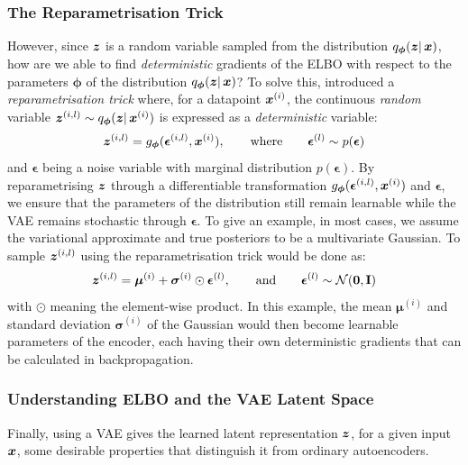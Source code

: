 \subsubsection{The Reparametrisation Trick}
However, since $\boldsymbol{z}$ is a random variable sampled from the distribution $q_{\boldsymbol{\phi}}(\boldsymbol{z} |\, \boldsymbol{x})$, how are we able to find \textit{deterministic} gradients of the ELBO with respect to the parameters $\boldsymbol{\phi}$ of the distribution $q_{\boldsymbol{\phi}}(\boldsymbol{z} |\, \boldsymbol{x})$? 
To solve this, \cite{variational_bayes} introduced a \textit{reparametrisation trick} where, for a datapoint $\boldsymbol{x}^{(i)}$, the continuous \textit{random} variable $\boldsymbol{z}^{(i,l)} \sim q_{\boldsymbol{\phi}}(\boldsymbol{z} |\, \boldsymbol{x}^{(i)})$
 is expressed as a \textit{deterministic} variable:
\begin{equation}
    \boldsymbol{z}^{(i,l)} = 
    g_{\boldsymbol{\phi}}(\boldsymbol{\epsilon}^{(i,l)}, \boldsymbol{x}^{(i)}), \qquad \text{where} \qquad
    \boldsymbol{\epsilon}^{(l)} \sim p(\boldsymbol{\epsilon})
\end{equation}
and $\boldsymbol{\epsilon}$ being a noise variable  with marginal distribution $p(\boldsymbol{\epsilon})$.
By reparametrising $\boldsymbol{z}$ through a differentiable transformation $g_{\boldsymbol{\phi}}(\boldsymbol{\epsilon}^{(i,l)}, \boldsymbol{x}^{(i)})$ and $\boldsymbol{\epsilon}$, we ensure that the parameters of the distribution still remain learnable while the VAE remains stochastic through $\boldsymbol{\epsilon}$. To give an example, in most cases, we assume the variational approximate and true posteriors to be a multivariate Gaussian. To sample $\boldsymbol{z}^{(i,l)}$ using the reparametrisation trick would be done as:
\begin{equation}
    \boldsymbol{z}^{(i,l)} = 
    \boldsymbol{\mu}^{(i)} + \boldsymbol{\sigma}^{(i)} \odot \boldsymbol{\epsilon}^{(l)},
    \qquad \text{and} \qquad
    \boldsymbol{\epsilon}^{(l)} \sim \mathcal{N}(\boldsymbol{0}, \textbf{I})
\end{equation}
with $\odot$ meaning the element-wise product.
In this example, the mean $\boldsymbol{\mu}^{(i)}$ and standard deviation $\boldsymbol{\sigma}^{(i)}$ of the Gaussian would then become learnable parameters of the encoder, each having their own deterministic gradients that can be calculated in backpropagation.

\subsubsection{Understanding ELBO and the VAE Latent Space}
Finally, using a VAE gives the learned latent representation $\boldsymbol{z}$, for a given input $\boldsymbol{x}$, some desirable properties that distinguish it from ordinary autoencoders.

